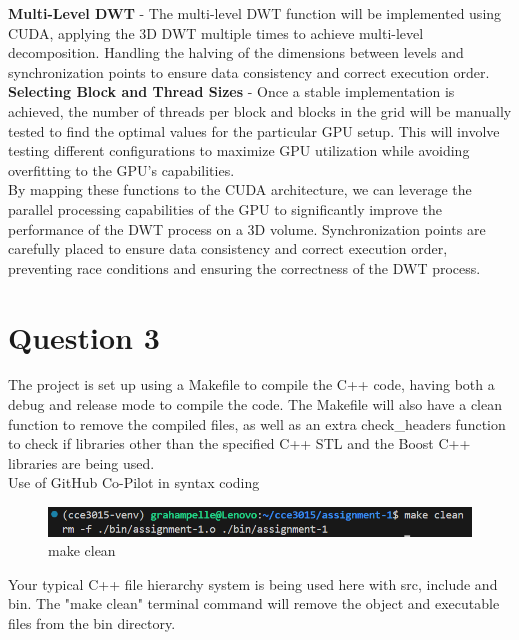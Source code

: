 \documentclass{article}
\begin{document}
\textbf{Multi-Level DWT} - The multi-level DWT function will be implemented using CUDA, applying the 3D DWT multiple times to achieve multi-level decomposition. Handling the halving of the dimensions between levels and synchronization points to ensure data consistency and correct execution order.\\

\textbf{Selecting Block and Thread Sizes} - Once a stable implementation is achieved, the number of threads per block and blocks in the grid will be manually tested to find the optimal values for the particular GPU setup. This will involve testing different configurations to maximize GPU utilization while avoiding overfitting to the GPU's capabilities.\\

By mapping these functions to the CUDA architecture, we can leverage the parallel processing capabilities of the GPU to significantly improve the performance of the DWT process on a 3D volume. Synchronization points are carefully placed to ensure data consistency and correct execution order, preventing race conditions and ensuring the correctness of the DWT process.\\

\pagebreak

\section{Question 3}
The project is set up using a Makefile to compile the C++ code, having both a debug and release mode to compile the code. The Makefile will also have a clean function to remove the compiled files, as well as an extra check\_headers function to check if libraries other than the specified C++ STL and the Boost C++ libraries are being used.\\
\begingroup
\tiny {Use of GitHub Co-Pilot in syntax coding \cite{Copilot2024}}
\endgroup

\begin{figure}[H]
    \centering
    \includegraphics[width=1.2\textwidth]{assets/make_clean.png}
    \caption{make clean}
    \label{fig4}
\end{figure}

Your typical C++ file hierarchy system is being used here with src, include and bin. The "make clean" terminal command will remove the object and executable files from the bin directory.\\
\end{document}
